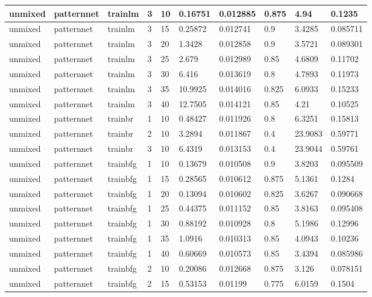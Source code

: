 \begin{longtable}{lllllllll}
unmixed & patternnet & trainlm & 3 & 10 & 0.16751 & 0.012885 & 0.875 & 4.94 & 0.1235 \\ \hline 
unmixed & patternnet & trainlm & 3 & 15 & 0.25872 & 0.012741 & 0.9 & 3.4285 & 0.085711 \\ \hline 
unmixed & patternnet & trainlm & 3 & 20 & 1.3428 & 0.012858 & 0.9 & 3.5721 & 0.089301 \\ \hline 
unmixed & patternnet & trainlm & 3 & 25 & 2.679 & 0.012989 & 0.85 & 4.6809 & 0.11702 \\ \hline 
unmixed & patternnet & trainlm & 3 & 30 & 6.416 & 0.013619 & 0.8 & 4.7893 & 0.11973 \\ \hline 
unmixed & patternnet & trainlm & 3 & 35 & 10.9925 & 0.014016 & 0.825 & 6.0933 & 0.15233 \\ \hline 
unmixed & patternnet & trainlm & 3 & 40 & 12.7505 & 0.014121 & 0.85 & 4.21 & 0.10525 \\ \hline 
unmixed & patternnet & trainbr & 1 & 10 & 0.48427 & 0.011926 & 0.8 & 6.3251 & 0.15813 \\ \hline 
unmixed & patternnet & trainbr & 2 & 10 & 3.2894 & 0.011867 & 0.4 & 23.9083 & 0.59771 \\ \hline 
unmixed & patternnet & trainbr & 3 & 10 & 6.4319 & 0.013153 & 0.4 & 23.9044 & 0.59761 \\ \hline 
unmixed & patternnet & trainbfg & 1 & 10 & 0.13679 & 0.010508 & 0.9 & 3.8203 & 0.095509 \\ \hline 
unmixed & patternnet & trainbfg & 1 & 15 & 0.28565 & 0.010612 & 0.875 & 5.1361 & 0.1284 \\ \hline 
unmixed & patternnet & trainbfg & 1 & 20 & 0.13094 & 0.010602 & 0.825 & 3.6267 & 0.090668 \\ \hline 
unmixed & patternnet & trainbfg & 1 & 25 & 0.44375 & 0.011152 & 0.85 & 3.8163 & 0.095408 \\ \hline 
unmixed & patternnet & trainbfg & 1 & 30 & 0.88192 & 0.010928 & 0.8 & 5.1986 & 0.12996 \\ \hline 
unmixed & patternnet & trainbfg & 1 & 35 & 1.0916 & 0.010313 & 0.85 & 4.0943 & 0.10236 \\ \hline 
unmixed & patternnet & trainbfg & 1 & 40 & 0.60669 & 0.010573 & 0.85 & 3.4394 & 0.085986 \\ \hline 
unmixed & patternnet & trainbfg & 2 & 10 & 0.20086 & 0.012668 & 0.875 & 3.126 & 0.078151 \\ \hline 
unmixed & patternnet & trainbfg & 2 & 15 & 0.53153 & 0.01199 & 0.775 & 6.0159 & 0.1504 \\ \hline 

\end{longtable}
